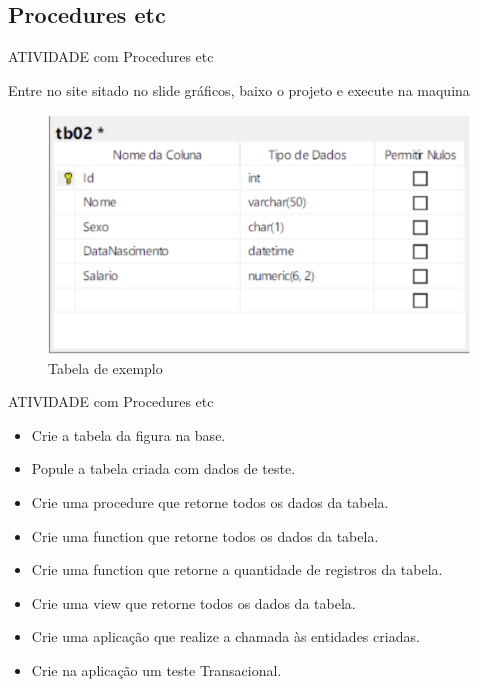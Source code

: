 	\subsection{Procedures etc}

	\begin{frame}
	
	
	
	
	\begin{CaixaModelo01}{ATIVIDADE com Procedures etc}
	
Entre no site sitado no slide gráficos, baixo o projeto e execute na maquina

			\begin{figure}
			\includegraphics[scale=.6]{./Figuras/Tabela02.png}
			\caption{Tabela de exemplo}
			\label{fig:Tabela02}
			\end{figure}



	\end{CaixaModelo01}

	\end{frame}


	\begin{frame}




\begin{CaixaModelo01}{ATIVIDADE com Procedures etc}
	
	
	\begin{itemize}
		\item Crie a tabela da figura na base.
		\item Popule a tabela criada com dados de teste.
		\item Crie uma procedure que retorne todos os dados da tabela. 
		\item Crie uma function que retorne todos os dados da tabela. 
		\item Crie uma function que retorne a quantidade de  registros da tabela. 
		\item Crie uma view que retorne todos os dados da tabela. 
		\item Crie uma aplicação que realize a chamada às entidades criadas. 
		\item Crie na aplicação um teste Transacional. 			
	\end{itemize}
	
\end{CaixaModelo01}

\end{frame}